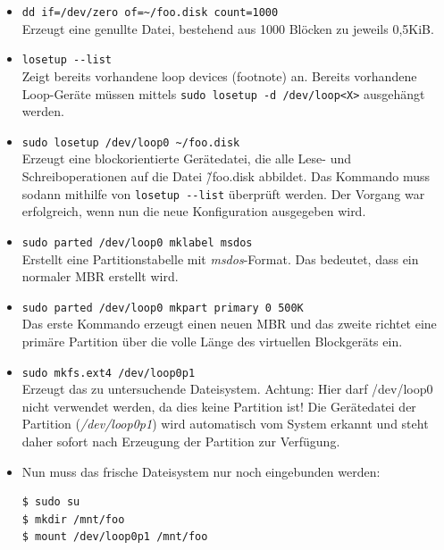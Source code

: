 \documentclass[11pt,a4paper]{article}
\def\inlinebash{\lstinline[style=bash]}
\begin{document}
\begin{itemize}
\item \inlinebash$dd if=/dev/zero of=~/foo.disk count=1000$\\
	Erzeugt eine genullte Datei, bestehend aus 1000 Blöcken zu jeweils 0,5KiB.

\item \inlinebash$losetup --list$\\
	Zeigt bereits vorhandene loop devices (footnote) an. Bereits vorhandene Loop-Geräte
	müssen mittels \inlinebash$sudo losetup -d /dev/loop<X>$ ausgehängt werden. 

\item \inlinebash$sudo losetup /dev/loop0 ~/foo.disk$\\
	Erzeugt eine blockorientierte Gerätedatei, die alle Lese- und Schreiboperationen
	auf die Datei \~/foo.disk abbildet. Das Kommando muss sodann mithilfe von
	\inlinebash$losetup --list$ überprüft werden. Der Vorgang war erfolgreich, 
	wenn nun die neue Konfiguration ausgegeben wird.

\item \inlinebash$sudo parted /dev/loop0 mklabel msdos$\\
	Erstellt eine Partitionstabelle mit \emph{msdos}-Format. Das bedeutet, dass
	ein normaler MBR erstellt wird.
	
\item \inlinebash$sudo parted /dev/loop0 mkpart primary 0 500K$\\
	Das erste Kommando erzeugt einen neuen MBR und das zweite
	richtet eine primäre Partition über die volle Länge des
	virtuellen Blockgeräts ein.

\item \inlinebash$sudo mkfs.ext4 /dev/loop0p1$\\
	Erzeugt das zu untersuchende Dateisystem. Achtung: Hier darf
	/dev/loop0 nicht verwendet werden, da dies keine Partition ist!
	Die Gerätedatei der Partition (\emph{/dev/loop0p1}) wird automatisch
	vom System erkannt und steht daher sofort nach Erzeugung der
	Partition zur Verfügung.

\item
Nun muss das frische Dateisystem nur noch eingebunden werden:

\begin{lstlisting}[style=bash]
$ sudo su
$ mkdir /mnt/foo
$ mount /dev/loop0p1 /mnt/foo
\end{lstlisting}
\end{itemize}
\end{document}
